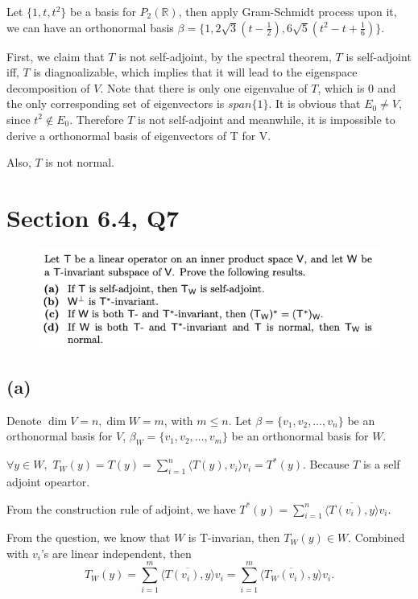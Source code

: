 \documentclass[12pt]{article}%
\begin{document}
Let $\{1,t,t^2\}$ be a basis for $P_2(\mathbb{R})$, then apply Gram-Schmidt process upon it, 
we can have an orthonormal basis $\beta=\{1,2\sqrt{3}(t-\frac{1}{2}),6\sqrt{5}(t^2-t+\frac{1}{6})\}.$

First, we claim that $T$ is not self-adjoint, by the spectral theorem, $T$ is 
self-adjoint iff, $T$ is diagnoalizable, which implies that it will lead to the 
eigenspace decomposition of $V$. Note that there is only one eigenvalue of $T$, 
which is 0 and the only corresponding set 
of eigenvectors is $span\{1\}$. It is obvious that $E_0 \neq V,$ 
since $t^2 \notin E_0.$ Therefore $T$ is not self-adjoint and meanwhile, 
it is impossible to derive a orthonormal basis of eigenvectors of T for V.

Also, $T$ is not normal.


\newpage

\section{Section 6.4, Q7}
\begin{figure}[htp]
    \centering %
    \includegraphics[width = 16cm]{img/Q6.png}
\end{figure}

\subsection{(a)}
Denote $\dim{V}=n,\dim{W}=m$, with $m\leq n.$ Let $\beta=\{v_1,v_2,\dots,v_n\}$
be an orthonormal basis for $V$, $\beta_W=\{v_1,v_2,\dots,v_m\}$ be an orthonormal basis for $W$.

$\forall y\in W,$ $T_W(y)=T(y)=\sum_{i=1}^n \langle T(y),v_i \rangle v_i=T^*(y).$ Because $T$ is a self adjoint opeartor.

From the construction rule of adjoint, we have 
$T^*(y)=\sum_{i=1}^n \overline{\langle T(v_i),y \rangle} v_i.$

From the question, we know that $W$ is T-invarian, then $T_W(y) \in W.$ Combined with $v_i$'s are 
linear independent, then 
$$T_W(y)=\sum_{i=1}^m \overline{\langle T(v_i),y \rangle} v_i=\sum_{i=1}^m \overline{\langle T_W(v_i),y \rangle} v_i.$$
\end{document}
